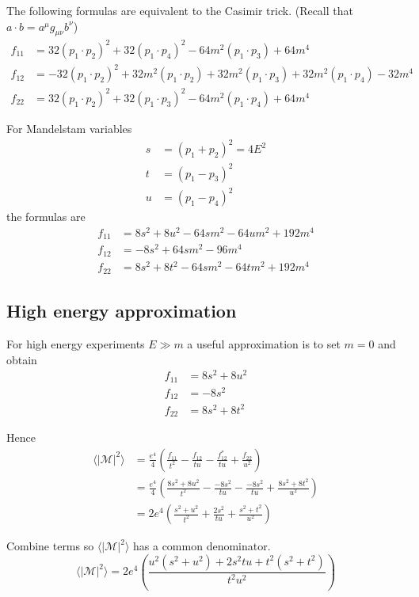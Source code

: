 \documentclass[12pt]{article}
\begin{document}
The following formulas are equivalent to the Casimir trick.
(Recall that $a\cdot b=a^\mu g_{\mu\nu}b^\nu$)
\begin{align*}
f_{11}&=
32 (p_1\cdot p_2)^2 +
32 (p_1\cdot p_4)^2 -
64 m^2 (p_1\cdot p_3) + 64 m^4
\\
f_{12}&=
-32 (p_1\cdot p_2)^2 +
32 m^2 (p_1\cdot p_2) +
32 m^2 (p_1\cdot p_3) +
32 m^2 (p_1\cdot p_4) - 32m^4
\\
f_{22}&=
32 (p_1\cdot p_2)^2 +
32 (p_1\cdot p_3)^2 -
64 m^2 (p_1\cdot p_4) + 64 m^4
\end{align*}

For Mandelstam variables
\begin{align*}
s&=(p_1+p_2)^2=4E^2
\\
t&=(p_1-p_3)^2
\\
u&=(p_1-p_4)^2
\end{align*}
the formulas are
\begin{align*}
f_{11} &= 8 s^2 + 8 u^2 - 64 s m^2 - 64 u m^2 + 192 m^4
\\
f_{12} &= -8 s^2 + 64 s m^2 - 96 m^4
\\
f_{22} &= 8 s^2 + 8 t^2 - 64 s m^2 - 64 t m^2 + 192 m^4
\end{align*}

\subsection*{High energy approximation}
For high energy experiments $E\gg m$ a useful approximation is to set $m=0$ and obtain
\begin{align*}
f_{11}&=8s^2+8u^2\\
f_{12}&=-8s^2\\
f_{22}&=8s^2+8t^2
\end{align*}

Hence
\begin{align*}
\langle|\mathcal{M}|^2\rangle
&=\frac{e^4}{4}
\left(
\frac{f_{11}}{t^2}-\frac{f_{12}}{tu}-\frac{f_{12}^*}{tu}+\frac{f_{22}}{u^2}
\right)
\\
&=\frac{e^4}{4}
\left(
\frac{8s^2+8u^2}{t^2}-\frac{-8s^2}{tu}-\frac{-8s^2}{tu}+\frac{8s^2+8t^2}{u^2}
\right)
\\
&=2e^4
\left(
\frac{s^2+u^2}{t^2}+\frac{2s^2}{tu}+\frac{s^2+t^2}{u^2}
\right)
\end{align*}

Combine terms so $\langle|\mathcal{M}|^2\rangle$ has a common denominator.
\begin{equation*}
\langle|\mathcal{M}|^2\rangle
=2e^4
\left(
\frac{u^2(s^2+u^2)+2s^2tu+t^2(s^2+t^2)}{t^2u^2}
\right)
\end{equation*}
\end{document}
